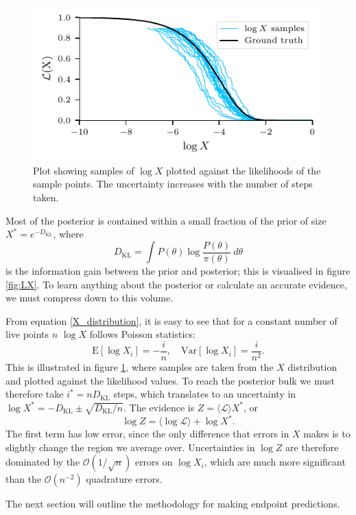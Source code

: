 \documentclass[usenatbib]{mnras}
\newcommand{\Like}{\mathcal{L}}
\newcommand{\DKL}{D_\mathrm{KL}}
\begin{document}
\begin{figure}
\begin{center}
	\includegraphics{Figures/X_samples.pdf}
\end{center}
\caption{Plot showing samples of $\log X$ plotted against the likelihoods of the sample points. The uncertainty increases with the number of steps taken.}
\label{fig:X_samples}
\end{figure}


Most of the posterior is contained within a small fraction of the prior of size $X^{*} = e^{-\DKL}$, where
\begin{equation}
\DKL = \int P(\theta) \log  \frac{P(\theta)}{\pi(\theta)} \ d\theta
\end{equation}
is the information gain between the prior and posterior; this is visualised in figure \ref{fig:LX}. To learn anything about the posterior or calculate an accurate evidence, we must compress down to this volume. 
\par
From equation \eqref{X_distribution}, it is easy to see that for a constant number of live points $n$ $\log X$ follows Poisson statistics:
\begin{equation}
	\mathrm{E}[\log X_i] = - \frac{i}{n}, \quad \mathrm{Var}[\log X_i] = \frac{i}{n^2}.
\end{equation}
This is illustrated in figure \ref{fig:X_samples}, where samples are taken from the $X$ distribution and plotted against the likelihood values. To reach the posterior bulk we must therefore take $i^{*} = n\DKL$ steps, which translates to an uncertainty in $\log X^{*} = -\DKL \pm \sqrt{\DKL/n}$. The evidence is $Z = \langle \Like \rangle X^{*}$, or
\begin{equation}
\log Z = \langle \log \Like \rangle + \log X^{*}.
\end{equation}
The first term has low error, since the only difference that errors in $X$ makes is to slightly change the region we average over. Uncertainties in $\log Z$ are therefore dominated by the $\mathcal{O}(1/\sqrt{n})$ errors on $\log X_i$, which are much more significant than the $\mathcal{O}(n^{-2})$ quadrature errors.
\par
The next section will outline the methodology for making endpoint predictions.
\end{document}
